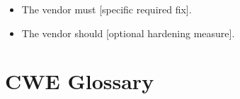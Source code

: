 \documentclass[11pt,a4paper]{article}
\newcommand{\ph}[1]{\lbrack#1\rbrack}
\begin{document}
\begin{itemize}[noitemsep]
\item \ph{The vendor must [specific required fix].}
\item \ph{The vendor should [optional hardening measure].}
\end{itemize}


\section{CWE Glossary}

\end{document}
